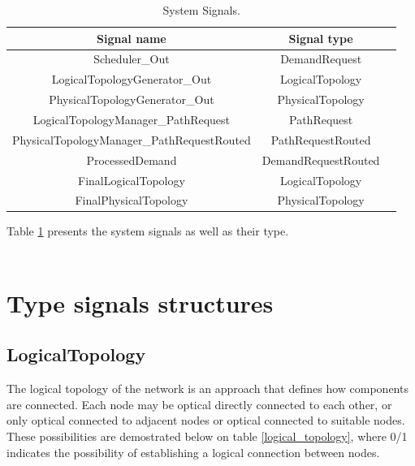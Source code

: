 \begin{table}[H]
	\centering
	\begin{tabular}{| c | c | c |}
		\hline
		 \textbf{Signal name} &  \textbf{Signal type} \\ %
		\hline
		Scheduler\_Out &  DemandRequest\\ \hline
		LogicalTopologyGenerator\_Out &  LogicalTopology\\ \hline
		PhysicalTopologyGenerator\_Out & PhysicalTopology\\ \hline
		LogicalTopologyManager\_PathRequest & PathRequest\\ \hline
		PhysicalTopologyManager\_PathRequestRouted & PathRequestRouted\\ \hline
		ProcessedDemand &  DemandRequestRouted\\ \hline
		FinalLogicalTopology & LogicalTopology\\ \hline
		FinalPhysicalTopology & PhysicalTopology\\ \hline
	\end{tabular}
	\caption{System Signals.}
	\label{system_signals}
\end{table}
	Table \ref{system_signals} presents the system signals as well as their type.\\ \\

\section{Type signals structures}

\subsection{LogicalTopology}

The logical topology of the network is an approach that defines how components are connected. Each node may be optical directly connected to each other, or only optical connected to adjacent nodes or optical connected to suitable nodes. These possibilities are demostrated below on table \ref{logical_topology}, where 0/1 indicates the possibility of establishing a logical connection between nodes.\\ 

